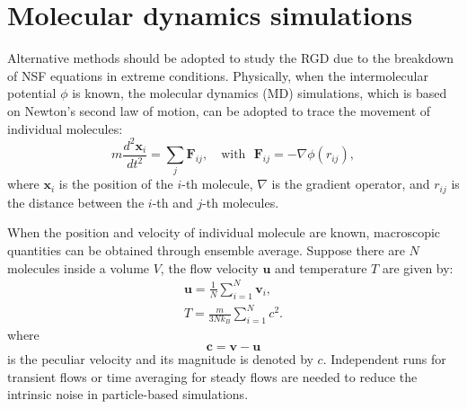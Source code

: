 



\section{Molecular dynamics simulations}\label{MD_formula}

Alternative methods should be adopted to study the RGD due to the breakdown of NSF equations in extreme conditions. Physically, when the intermolecular potential  $\phi$ is known, the molecular dynamics (MD) simulations, which is based on Newton's second law of motion, can be adopted to trace the movement of individual molecules:
\begin{equation}\label{Newtwon_equation}
m\frac{d^2\bm{x}_i}{dt^2}=\sum_j\bm{F}_{ij}, 
\quad \text{with~~} \bm{F}_{ij}=-\nabla\phi({r}_{ij}),
\end{equation}
where $\bm{x}_i$ is the position of the $i$-th molecule, $\nabla$ is the gradient operator, and ${r}_{ij}$ is the distance between the $i$-th and $j$-th molecules. 

When the position and velocity of individual molecule are known, macroscopic quantities can be obtained through ensemble average. Suppose there are $N$ molecules inside a volume $V$, the flow velocity $\bm{u}$ and temperature $T$ are given by:
\begin{eqnarray}
\bm{u}= \frac{1}{N} \sum_{i=1}^N \bm{v}_i,\\
T= \frac{m}{3Nk_B} \sum_{i=1}^N c^2.
\end{eqnarray}
where
\begin{equation}
	\bm{c}=\bm{v}-\bm{u}
\end{equation} 
is the peculiar velocity  and its magnitude is denoted by $c$. 
Independent runs for transient flows or time averaging for steady flows are needed to reduce the intrinsic noise in particle-based simulations.



